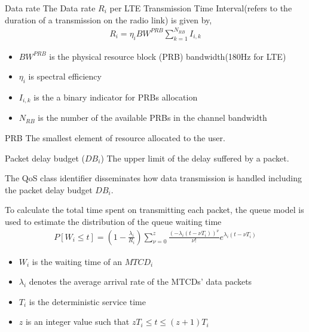 \documentclass{beamer}
\begin{document}
\begin{frame}{}
    \begin{block}{Data rate}
    The Data rate $R_i$ per LTE Transmission Time Interval(refers to the duration of a transmission on the radio link) is given by,
    \begin{align}
        R_i = \eta_i {BW}^{PRB}\sum\limits_{k=1}^{N_{RB}}I_{i,k}
    \end{align}
    \end{block}
    \begin{block}{}
    \begin{itemize}
        \item ${BW}^{PRB}$ is the physical resource block (PRB) bandwidth(180Hz for LTE)
        \item $\eta_i$ is spectral efficiency 
        \item $I_{i,k}$ is the a binary indicator for PRBs allocation
        \item $N_{RB}$ is the number of the available PRBs in the channel  bandwidth
    \end{itemize}
    \end{block}
    \begin{block}{PRB}
    The smallest element of resource allocated to the user.
    \end{block}
\end{frame}
\begin{frame}{}
    \begin{block}{Packet delay budget ($DB_i$)}
     The upper limit of the delay suffered by a packet.
     
    The QoS class identifier disseminates how data transmission is handled including the packet delay budget $DB_i$.
    \end{block}
    \begin{block}{}
    To calculate the total time spent on transmitting each packet, the queue model is used to estimate the distribution of the queue waiting time
    \begin{align}
        P[W_i \leq t] = \left(1 - \frac{\lambda_i}{R_i}\right)\sum\limits_{\nu = 0}^{z}\frac{\left(-\lambda_i(t - \nu T_i)\right)^\nu}{\nu!}e^{\lambda_i(t - \nu T_i)}
    \end{align}
    \end{block}
    \begin{block}{}
    \begin{itemize}
        \item $W_i$ is the waiting time of an $MTCD_i$
        \item $\lambda_i$ denotes the average arrival rate of the MTCDs’ data packets
        \item $T_i$ is the deterministic service time
        \item $z$ is an integer value such that $z T_i\leq t\leq(z+1)T_i$
    \end{itemize}
    \end{block}
\end{frame}
\end{document}

